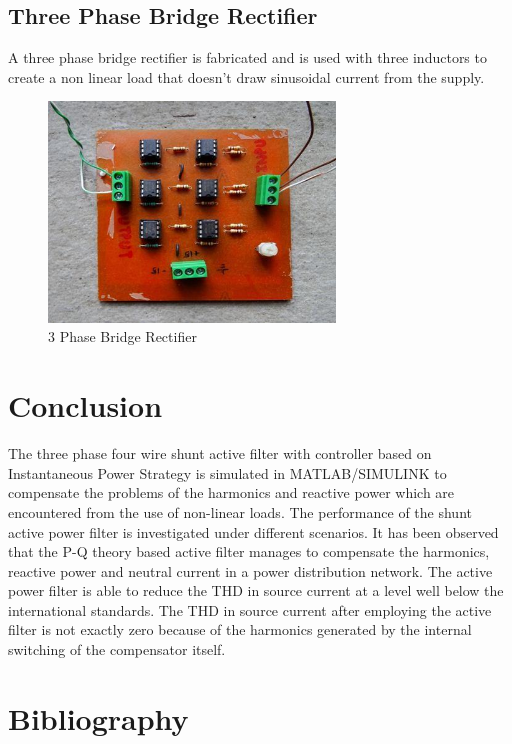\documentclass[journal,twoside]{IEEEtran}
\begin{document}
\subsection{Three Phase Bridge Rectifier}
A three phase bridge rectifier is fabricated and is used
with three inductors to create a non linear load that doesn't
draw sinusoidal current from the supply.
\begin{figure}[!ht]
\centering
\includegraphics[width=3in]{7}
\caption{3 Phase Bridge Rectifier}
\label{f7}
\end{figure}

\section{Conclusion}
The three phase four wire shunt active filter with controller
based on Instantaneous Power Strategy is simulated in
MATLAB/SIMULINK to compensate the problems of the
harmonics and reactive power which are encountered from the
use of non-linear loads. The performance of the shunt active
power filter is investigated under different scenarios. It has
been observed that the P-Q theory based active filter manages
to compensate the harmonics, reactive power and neutral
current in a power distribution network. The active power
filter is able to reduce the THD in source current at a level
well below the international standards. The THD in source
current after employing the active filter is not exactly zero
because of the harmonics generated by the internal switching
of the compensator itself.


\section*{Bibliography}
\end{document}
